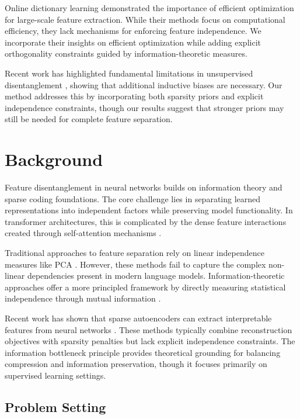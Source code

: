 \documentclass{article} %
\begin{document}
Online dictionary learning \cite{Mairal2009OnlineLF} demonstrated the importance of efficient optimization for large-scale feature extraction. While their methods focus on computational efficiency, they lack mechanisms for enforcing feature independence. We incorporate their insights on efficient optimization while adding explicit orthogonality constraints guided by information-theoretic measures.

Recent work has highlighted fundamental limitations in unsupervised disentanglement \cite{Locatello2018ChallengingCA}, showing that additional inductive biases are necessary. Our method addresses this by incorporating both sparsity priors and explicit independence constraints, though our results suggest that stronger priors may still be needed for complete feature separation.

\section{Background}
\label{sec:background}

Feature disentanglement in neural networks builds on information theory and sparse coding foundations. The core challenge lies in separating learned representations into independent factors while preserving model functionality. In transformer architectures, this is complicated by the dense feature interactions created through self-attention mechanisms \cite{vaswani2017attention}.

Traditional approaches to feature separation rely on linear independence measures like PCA \cite{F.R.S.1901LIIIOL}. However, these methods fail to capture the complex non-linear dependencies present in modern language models. Information-theoretic approaches offer a more principled framework by directly measuring statistical independence through mutual information \cite{Bell1995AnIA}.

Recent work has shown that sparse autoencoders can extract interpretable features from neural networks \cite{Vincent2010StackedDA}. These methods typically combine reconstruction objectives with sparsity penalties but lack explicit independence constraints. The information bottleneck principle \cite{Tishby2015DeepLA} provides theoretical grounding for balancing compression and information preservation, though it focuses primarily on supervised learning settings.

\subsection{Problem Setting}
\label{subsec:problem}
\end{document}
